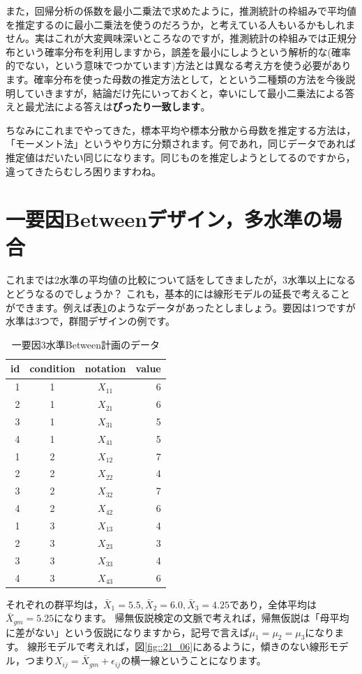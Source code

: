\documentclass{ltjsarticle}
\begin{document}
また，回帰分析の係数を最小二乗法で求めたように，推測統計の枠組みで平均値を推定するのに最小二乗法を使うのだろうか，と考えている人もいるかもしれません。実はこれが大変興味深いところなのですが，推測統計の枠組みでは正規分布という確率分布を利用しますから，誤差を最小にしようという解析的な(確率的でない，という意味でつかています)方法とは異なる考え方を使う必要があります。確率分布を使った母数の推定方法として，とという二種類の方法を今後説明していきますが，結論だけ先にいっておくと，幸いにして最小二乗法による答えと最尤法による答えは\textbf{ぴったり一致します}。

ちなみにこれまでやってきた，標本平均や標本分散から母数を推定する方法は，「モーメント法」というやり方に分類されます。何であれ，同じデータであれば推定値はだいたい同じになります。同じものを推定しようとしてるのですから，違ってきたらむしろ困りますわね。

\section{一要因Betweenデザイン，多水準の場合}
これまでは2水準の平均値の比較について話をしてきましたが，3水準以上になるとどうなるのでしょうか？
これも，基本的には線形モデルの延長で考えることができます。例えば表\ref{table::21_02}のようなデータがあったとしましょう。要因は1つですが水準は3つで，群間デザインの例です。
\begin{table}[ht]
    \centering
    \caption{一要因3水準Between計画のデータ}
    \begin{tabular}{rccr}
      \hline
    id & condition & notation & value \\ 
      \hline
      1 & 1 & $X_{11}$ & 6 \\ 
      2 & 1 & $X_{21}$ & 6 \\ 
      3 & 1 & $X_{31}$ & 5 \\ 
      4 & 1 & $X_{41}$ & 5 \\ 
      1 & 2 & $X_{12}$ & 7 \\ 
      2 & 2 & $X_{22}$ & 4 \\ 
      3 & 2 & $X_{32}$ & 7 \\ 
      4 & 2 & $X_{42}$ & 6 \\ 
      1 & 3 & $X_{13}$ & 4 \\ 
      2 & 3 & $X_{23}$ & 3 \\ 
      3 & 3 & $X_{33}$ & 4 \\ 
      4 & 3 & $X_{43}$ & 6 \\ 
       \hline
    \end{tabular}
    \label{table::21_02}
    \end{table}
それぞれの群平均は，$\bar{X}_1 = 5.5,\bar{X}_2 = 6.0,\bar{X}_3 = 4.25$であり，全体平均は$\bar{X}_{gm}= 5.25$になります。
帰無仮説検定の文脈で考えれば，帰無仮説は「母平均に差がない」という仮説になりますから，記号で言えば$\mu_1 = \mu_2 = \mu_3$になります。
線形モデルで考えれば，図\ref{fig::21_06}にあるように，傾きのない線形モデル，つまり$X_{ij} = \bar{X}_{gm} + \epsilon_{ij}$の横一線ということになります。
\end{document}
